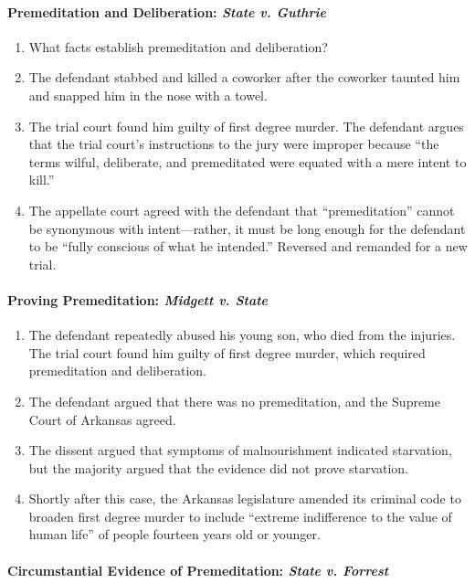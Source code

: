 \paragraph{Premeditation and Deliberation: \emph{State v. Guthrie}}

\begin{enumerate}
    \item What facts establish premeditation and deliberation?
    \item The defendant stabbed and killed a coworker after the coworker taunted him and snapped him in the nose with a towel.
    \item The trial court found him guilty of first degree murder. The defendant argues that the trial court's instructions to the jury were improper because ``the terms wilful, deliberate, and premeditated were equated with a mere intent to kill.''
    \item The appellate court agreed with the defendant that ``premeditation'' cannot be synonymous with intent---rather, it must be long enough for the defendant to be ``fully conscious of what he intended.'' Reversed and remanded for a new trial.
\end{enumerate}

\paragraph{Proving Premeditation: \emph{Midgett v. State}}

\begin{enumerate}
    \item The defendant repeatedly abused his young son, who died from the injuries. The trial court found him guilty of first degree murder, which required premeditation and deliberation.
    \item The defendant argued that there was no premeditation, and the Supreme Court of Arkansas agreed.
    \item The dissent argued that symptoms of malnourishment indicated starvation, but the majority argued that the evidence did not prove starvation.
    \item Shortly after this case, the Arkansas legislature amended its criminal code to broaden first degree murder to include ``extreme indifference to the value of human life'' of people fourteen years old or younger.
\end{enumerate}

\paragraph{Circumstantial Evidence of Premeditation: \emph{State v. Forrest}}

